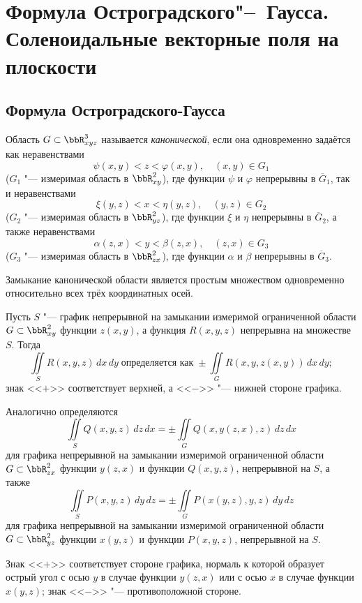 \chapter{Формула Остроградского"--~Гаусса. Соленоидальные векторные поля на плоскости}
\section{Формула Остроградского-Гаусса}

\begin{defn}

Область $G \subset \bbR^3_{xyz}$ называется \textit{канонической}, если она одновременно задаётся как неравенствами
$$
\psi(x, y) < z < \varphi(x, y), \quad (x, y) \in G_1
$$
($G_1$ "--- измеримая область в $\bbR^2_{xy}$), где функции $\psi$ и $\varphi$ непрерывны в $\overline{G}_1$, так и неравенствами
$$
\xi(y, z) < x < \eta(y, z), \quad (y, z) \in G_2
$$
($G_2$ "--- измеримая область в $\bbR^2_{yz}$), где функции $\xi$ и $\eta$ непрерывны в $\overline{G}_2$, а также неравенствами
$$
\alpha(z, x) < y < \beta(z, x), \quad (z, x) \in G_3
$$
($G_3$ "--- измеримая область в $\bbR^2_{zx}$), где функции $\alpha$ и $\beta$ непрерывны в $\overline{G}_3$.

Замыкание канонической области является простым множеством одновременно относительно всех трёх координатных осей.
\end{defn}

\begin{defn} \label{df20:17}
Пусть $S$ "--- график непрерывной на замыкании измеримой ограниченной области $G \subset \bbR^2_{xy}$ функции $z(x, y)$, а функция $R(x, y, z)$ непрерывна на множестве $S$. Тогда
$$
\iint\limits_{S} R(x, y, z)\,dx\,dy \; \text{определяется как} \; \pm \iint\limits_{G} R(x, y, z(x, y))\,dx\,dy;
$$
знак <<$+$>> соответствует верхней, а <<$-$>> "--- нижней стороне графика.

Аналогично определяются
$$
\iint\limits_{S} Q(x, y, z)\,dz\,dx = \pm \iint\limits_{G} Q(x, y(z, x), z)\,dz\,dx
$$
для графика непрерывной на замыкании измеримой ограниченной области $G \subset \bbR^2_{zx}$ функции $y(z, x)$ и функции $Q(x, y, z)$, непрерывной на $S$, а также
$$
\iint\limits_{S} P(x, y, z)\,dy\,dz = \pm \iint\limits_{G} P(x(y, z), y, z)\,dy\,dz
$$
для графика непрерывной на замыкании измеримой ограниченной области $G \subset \bbR^2_{yz}$ функции $x(y, z)$ и функции $P(x, y, z)$, непрерывной на $S$.

Знак <<$+$>> соответствует стороне графика, нормаль к которой образует острый угол с осью $y$ в случае функции $y(z, x)$ или с осью $x$ в случае функции $x(y, z)$; знак <<$-$>> "--- противоположной стороне.
\end{defn}

